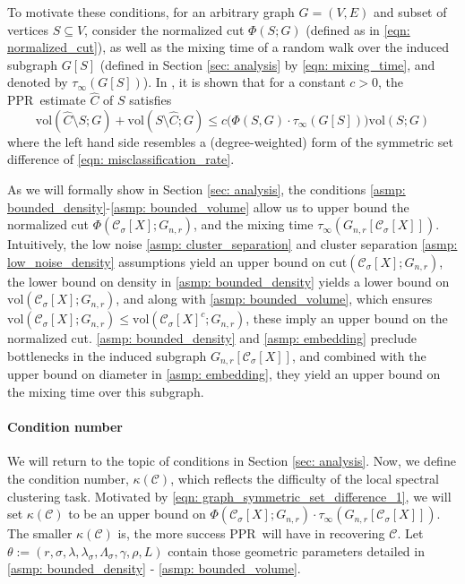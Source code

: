 \documentclass{article}
\newcommand{\diam}{\rho}
\newcommand{\vol}{\mathrm{vol}}
\newcommand{\cut}{\mathrm{cut}}
\newcommand{\1}{\mathbf{1}}
\newcommand{\Xbf}{X}             %
\newcommand{\Cset}{\mathcal{C}}
\newcommand{\Csig}{\Cset_{\sigma}}
\newcommand{\pprspace}{{\sc PPR~}}
\theoremstyle{aldenthm}
\theoremstyle{aldenrmrk}
\begin{document}
To motivate these conditions, for an arbitrary graph $G = (V,E)$ and subset of vertices $S \subseteq V$, consider the normalized cut $\Phi(S;G)$ (defined as in \eqref{eqn: normalized_cut}), as well as the mixing time of a random walk over the induced subgraph $G[S]$ (defined in Section \ref{sec: analysis} by \eqref{eqn: mixing_time}, and denoted by $\tau_{\infty}(G[S])$). In \citet{zhu2013}, it is shown that for a constant $c > 0$, the \pprspace estimate $\widehat{C}$ of $S$ satisfies
\begin{equation}
\label{eqn: graph_symmetric_set_difference_1}
\vol(\widehat{C} \setminus S; G) + \vol(S \setminus \widehat{C}; G) \leq c \bigl( \Phi(S,G) \cdot \tau_{\infty}(G[S])\bigr) \vol(S;G)
\end{equation}
where the left hand side resembles a (degree-weighted) form of the symmetric set difference of \eqref{eqn: misclassification_rate}. 

As we will formally show in Section \ref{sec: analysis}, the conditions \ref{asmp: bounded_density}-\ref{asmp: bounded_volume} allow us to upper bound the normalized cut $\Phi(\Csig[\Xbf]; G_{n,r})$, and the mixing time $\tau_{\infty}(G_{n,r}[\Csig[\Xbf]])$. Intuitively, the low noise \ref{asmp: cluster_separation} and cluster separation \ref{asmp: low_noise_density} assumptions yield an upper bound on $\cut(\Csig[\Xbf]; G_{n,r})$, the lower bound on density in \ref{asmp: bounded_density} yields a lower bound on $\vol(\Csig[\Xbf]; G_{n,r})$, and along with \ref{asmp: bounded_volume}, which ensures $\vol(\Csig[\Xbf]; G_{n,r}) \leq \vol(\Csig[\Xbf]^c; G_{n,r})$, these imply an upper bound on the normalized cut. \ref{asmp: bounded_density} and \ref{asmp: embedding} preclude bottlenecks in the induced subgraph $G_{n,r}[\Csig[\Xbf]]$, and combined with the upper bound on diameter in \ref{asmp: embedding}, they yield an upper bound on the mixing time over this subgraph.

\paragraph{Condition number} We will return to the topic of conditions in Section \ref{sec: analysis}. Now, we define the condition number, $\kappa(\Cset)$, which reflects the difficulty of the local spectral clustering task. Motivated by \eqref{eqn: graph_symmetric_set_difference_1}, we will set $\kappa(\Cset)$ to be an upper bound on $\Phi(\Csig[\Xbf]; G_{n,r}) \cdot \tau_{\infty}(G_{n,r}[\Csig[\Xbf]])$. The smaller $\kappa(\Cset)$ is, the more success \pprspace will have in recovering $\Cset$. Let $\theta := (r, \sigma, \lambda, \lambda_{\sigma}, \Lambda_{\sigma}, \gamma, \diam, L)$ contain those geometric parameters detailed in \ref{asmp: bounded_density} - \ref{asmp: bounded_volume}.
\end{document}

